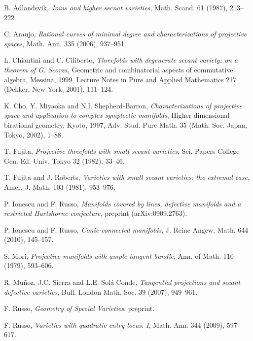 \documentclass[11pt]{amsart}
\theoremstyle{theorem} %
\theoremstyle{definition}
\numberwithin{equation}{section}
\begin{document}
%
\begin{thebibliography}{PTW02}%

 B. \AA dlandsvik, \emph{Joins and higher secnat varieties}, Math. Scand. 61 (1987), 213--222.

 C. Araujo, \emph{Rational curves of minimal degree and characterizations of projective spaces}, Math. Ann. 335 (2006), 937--951.

 L. Chiantini and C. Ciliberto, \emph{Threefolds with degenerate secant variety: on a theorem of G. Scorza}, Geometric and combinatorial aspects of commutative algebra, Messina, 1999, Lecture Notes in Pure and Applied Mathematics 217 (Dekker, New York, 2001), 111--124.

 K. Cho, Y. Miyaoka and N.I. Shepherd-Barron, \emph{Characterizations of projective space and application to complex symplectic manifolds}, Higher dimensional birational geometry, Kyoto, 1997, Adv. Stud. Pure Math. 35 (Math. Soc. Japan, Tokyo, 2002), 1–88.

 T. Fujita,
{\em Projective threefolds with small secant varieties}, Sci. Papers College Gen. Ed. Univ. Tokyo 32 (1982), 33--46.

 T. Fujita and J. Roberts,
{\em Varieties with small secant varieties: the extremal case}, Amer. J. Math. 103 (1981), 953--976.



 P. Ionescu and F. Russo, \emph{Manifolds covered by lines, defective manifolds and a restricted Hartshorne conjecture}, preprint (arXiv:0909.2763).

 P. Ionescu and F. Russo, \emph{Conic-connected manifolds}, J. Reine Angew. Math. 644 (2010), 145--157.

 S. Mori, \emph{Projective manifolds with ample tangent bundle}, Ann. of Math. 110 (1979), 593--606.

 R. Mu\~noz, J.C. Sierra and L.E. Sol\'a Conde, \emph{Tangential projections and secant defective varieties}, Bull. London Math. Soc. 39 (2007), 949--961.



 F. Russo, \emph{Geometry of Special Varieties}, preprint.

 F. Russo, \emph{Varieties with quadratic entry locus. I}, Math. Ann. 344 (2009), 597--617.


\end{thebibliography}
\end{document}
